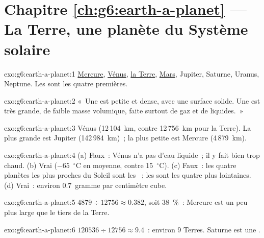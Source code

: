 \section*{Chapitre \ref{ch:g6:earth-a-planet} --- La Terre, une planète du Système solaire}

\begin{solution}{exo:g6:earth-a-planet:1}
\underline{Mercure}, \underline{Vénus}, \underline{la Terre},
\underline{Mars}, Jupiter, Saturne, Uranus, Neptune. Les  sont les quatre premières.
\end{solution}

\begin{solution}{exo:g6:earth-a-planet:2}
«~Une  est petite et dense, avec une surface solide. Une
 est très grande, de faible masse volumique, faite surtout de
gaz et de liquides.~»
\end{solution}

\begin{solution}{exo:g6:earth-a-planet:3}
Vénus (12\,104~km, contre 12\,756~km pour la Terre). La plus grande est
Jupiter (142\,984~km)~; la plus petite est Mercure (4\,879~km).
\end{solution}

\begin{solution}{exo:g6:earth-a-planet:4}
(a) Faux~: Vénus n'a pas d'eau liquide~; il y fait bien trop chaud.
(b) Vrai ($-65$~$^\circ$C en moyenne, contre 15~$^\circ$C). (c) Faux~: les
quatre planètes les plus proches du Soleil sont les ~;
les  sont les quatre plus lointaines. (d) Vrai~: environ
0.7~gramme par centimètre cube.
\end{solution}

\begin{solution}{exo:g6:earth-a-planet:5}
$4879 \div 12756 \approx 0.382$, soit 38~\%~: Mercure est un peu plus
large que le tiers de la Terre.
\end{solution}

\begin{solution}{exo:g6:earth-a-planet:6}
$120536 \div 12756 \approx 9.4$~: environ 9 Terres. Saturne est une .
\end{solution}

